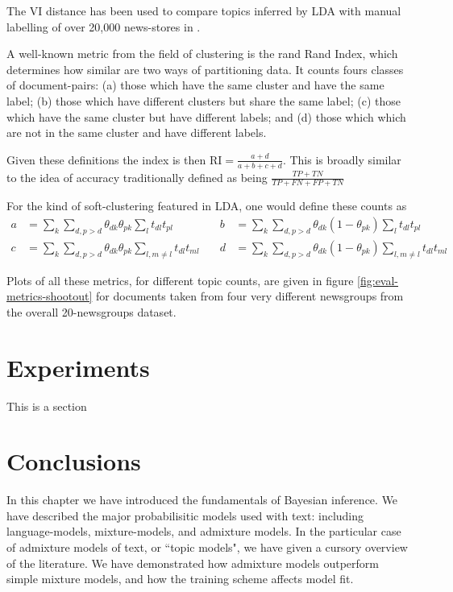 The VI distance has been used to compare topics inferred by LDA with manual labelling of over 20,000 news-stores in \cite{HeinrichEtAl2005}. 


A well-known metric from the field of clustering is the rand Rand Index, which determines how similar are two ways of partitioning data. It counts fours classes of document-pairs: (a) those which have the same cluster and have the same label; (b) those which have different clusters but share the same label; (c) those which have the same cluster but have different labels; and (d) those which which are not in the same cluster and have different labels.

Given these definitions the index is then $\text{RI} = \frac{a + d}{a + b + c + d}$. This is broadly similar to the idea of accuracy traditionally defined as being $\frac{TP + TN}{TP + FN + FP + TN}$

For the kind of soft-clustering featured in LDA, one would define these counts as
\begin{equation}
\begin{aligned}
a & = \sum_k \sum_{d, {p>d}} \theta_{dk} \theta_{pk} \sum_l t_{dl}t_{pl} & \quad
b & = \sum_k \sum_{d, {p>d}} \theta_{dk} (1 -\theta_{pk}) \sum_l t_{dl}t_{pl}\\
c & = \sum_k \sum_{d, {p>d}} \theta_{dk} \theta_{pk} \sum_{l,m \neq l} t_{dl}t_{ml} & \quad
d & = \sum_k \sum_{d, {p>d}} \theta_{dk} (1- \theta_{pk}) \sum_{l,m \neq l} t_{dl}t_{ml}
\end{aligned}
\end{equation}

Plots of all these metrics, for different topic counts, are given in figure \ref{fig:eval-metrics-shootout} for documents taken from four very different newsgroups from the overall 20-newsgroups dataset.

\section{Experiments}
\label{sec:chap1:experiments}
This is a section

\section{Conclusions}
In this chapter we have introduced the fundamentals of Bayesian inference. We have described the major probabilisitic models used with text: including language-models, mixture-models, and admixture models. In the particular case of admixture models of text, or ``topic models", we have given a cursory overview of the literature. We have demonstrated how admixture models outperform simple mixture models, and how the training scheme affects model fit. 


